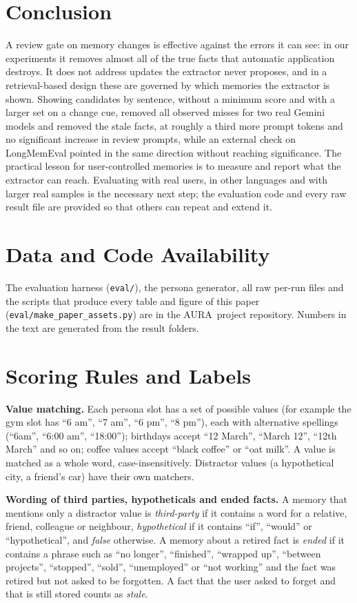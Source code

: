 \IfFileExists{IEEEtran.cls}{\documentclass[journal]{IEEEtran}\def\HAVEIEEE{1}}{\documentclass[10pt,twocolumn]{article}\usepackage[margin=0.7in,columnsep=0.25in]{geometry}}
\providecommand{\appendices}{\appendix}
\newcommand{\aura}{AURA}
\begin{document}
\section{Conclusion}
A review gate on memory changes is effective against the errors it can see: in our experiments it removes almost all of the true facts that automatic application destroys. It does not address updates the extractor never proposes, and in a retrieval-based design these are governed by which memories the extractor is shown. Showing candidates by sentence, without a minimum score and with a larger set on a change cue, removed all observed misses for two real Gemini models and removed the stale facts, at roughly a third more prompt tokens and no significant increase in review prompts, while an external check on LongMemEval pointed in the same direction without reaching significance. The practical lesson for user-controlled memories is to measure and report what the extractor can reach. Evaluating with real users, in other languages and with larger real samples is the necessary next step; the evaluation code and every raw result file are provided so that others can repeat and extend it.

\section*{Data and Code Availability}
The evaluation harness (\texttt{eval/}), the persona generator, all raw per-run files and the scripts that produce every table and figure of this paper (\texttt{eval/make\_paper\_assets.py}) are in the \aura\ project repository. Numbers in the text are generated from the result folders.

\appendices
\section{Scoring Rules and Labels}
\label{app:scoring}
\textbf{Value matching.} Each persona slot has a set of possible values (for example the gym slot has ``6 am'', ``7 am'', ``6 pm'', ``8 pm''), each with alternative spellings (``6am'', ``6:00 am'', ``18:00''); birthdays accept ``12 March'', ``March 12'', ``12th March'' and so on; coffee values accept ``black coffee'' or ``oat milk''. A value is matched as a whole word, case-insensitively. Distractor values (a hypothetical city, a friend's car) have their own matchers.

\textbf{Wording of third parties, hypotheticals and ended facts.} A memory that mentions only a distractor value is \emph{third-party} if it contains a word for a relative, friend, colleague or neighbour, \emph{hypothetical} if it contains ``if'', ``would'' or ``hypothetical'', and \emph{false} otherwise. A memory about a retired fact is \emph{ended} if it contains a phrase such as ``no longer'', ``finished'', ``wrapped up'', ``between projects'', ``stopped'', ``sold'', ``unemployed'' or ``not working'' and the fact was retired but not asked to be forgotten. A fact that the user asked to forget and that is still stored counts as \emph{stale}.
\end{document}
